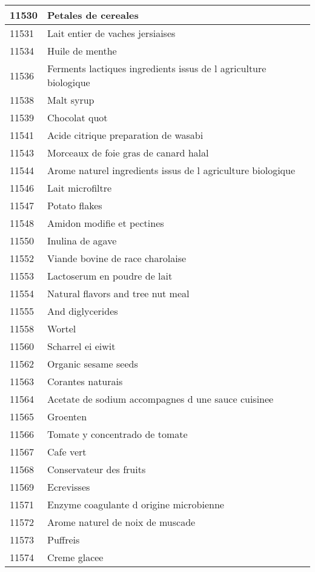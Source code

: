 \begin{longtable}{|l|l|}
11530 & Petales de cereales \\ \hline 
11531 & Lait entier de vaches jersiaises \\ \hline 
11534 & Huile de menthe \\ \hline 
11536 & Ferments lactiques  ingredients issus de l agriculture biologique \\ \hline 
11538 & Malt syrup \\ \hline 
11539 & Chocolat quot \\ \hline 
11541 & Acide citrique preparation de wasabi \\ \hline 
11543 & Morceaux de foie gras de canard halal \\ \hline 
11544 & Arome naturel  ingredients issus de l agriculture biologique \\ \hline 
11546 & Lait microfiltre \\ \hline 
11547 & Potato flakes \\ \hline 
11548 & Amidon modifie et pectines \\ \hline 
11550 & Inulina de agave \\ \hline 
11552 & Viande bovine de race charolaise \\ \hline 
11553 & Lactoserum en poudre de lait \\ \hline 
11554 & Natural flavors and tree nut meal \\ \hline 
11555 & And diglycerides \\ \hline 
11558 & Wortel \\ \hline 
11560 & Scharrel ei eiwit \\ \hline 
11562 & Organic sesame seeds \\ \hline 
11563 & Corantes naturais \\ \hline 
11564 & Acetate de sodium accompagnes d une sauce cuisinee \\ \hline 
11565 & Groenten \\ \hline 
11566 & Tomate y concentrado de tomate \\ \hline 
11567 & Cafe vert \\ \hline 
11568 & Conservateur des fruits \\ \hline 
11569 & Ecrevisses \\ \hline 
11571 & Enzyme coagulante d origine microbienne \\ \hline 
11572 & Arome naturel de noix de muscade \\ \hline 
11573 & Puffreis \\ \hline 
11574 & Creme glacee \\ \hline 

\end{longtable}
